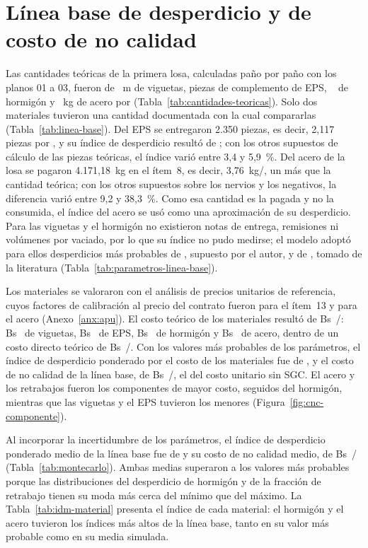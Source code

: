 \section{Línea base de desperdicio y de costo de no calidad}
\label{sec:res-linea-base}

Las cantidades teóricas de la primera losa, calculadas paño por paño con los planos 01 a 03, fueron de \QteoVig{}~m de viguetas, \QteoEps{} piezas de complemento de EPS, \QteoHor{}~\mtres{} de hormigón y \QteoAce{}~kg de acero por \mdos{} (Tabla~\ref{tab:cantidades-teoricas}). Solo dos materiales tuvieron una cantidad documentada con la cual compararlas (Tabla~\ref{tab:linea-base}). Del EPS se entregaron 2.350 piezas, es decir, 2,117 piezas por \mdos{}, y su índice de desperdicio resultó de \IDMsinEps{}; con los otros supuestos de cálculo de las piezas teóricas, el índice varió entre 3,4 y 5,9~\%. Del acero de la losa se pagaron 4.171,18~kg en el ítem~8, es decir, 3,76~kg/\mdos{}, un \IDMsinAce{} más que la cantidad teórica; con los otros supuestos sobre los nervios y los negativos, la diferencia varió entre 9,2 y 38,3~\%. Como esa cantidad es la pagada y no la consumida, el índice del acero se usó como una aproximación de su desperdicio. Para las viguetas y el hormigón no existieron notas de entrega, remisiones ni volúmenes por vaciado, por lo que su índice no pudo medirse; el modelo adoptó para ellos desperdicios más probables de \IDMsinVig{}, supuesto por el autor, y de \IDMsinHor{}, tomado de la literatura (Tabla~\ref{tab:parametros-linea-base}).

Los materiales se valoraron con el análisis de precios unitarios de referencia, cuyos factores de calibración al precio del contrato fueron \KappaTrece{} para el ítem~13 y \KappaAcero{} para el acero (Anexo~\ref{anx:apu}). El costo teórico de los materiales resultó de Bs~\CMteo/\mdos{}: Bs~\CostoVig{} de viguetas, Bs~\CostoEps{} de EPS, Bs~\CostoHor{} de hormigón y Bs~\CostoAce{} de acero, dentro de un costo directo teórico de Bs~\CDteo/\mdos{}. Con los valores más probables de los parámetros, el índice de desperdicio ponderado por el costo de los materiales fue de \IDMsinDet{}, y el costo de no calidad de la línea base, de Bs~\CNCsinDet/\mdos{}, el \CNCsinDetPct{} del costo unitario sin SGC. El acero y los retrabajos fueron los componentes de mayor costo, seguidos del hormigón, mientras que las viguetas y el EPS tuvieron los menores (Figura~\ref{fig:cnc-componente}).

Al incorporar la incertidumbre de los parámetros, el índice de desperdicio ponderado medio de la línea base fue de \IDMsinMedia{} y su costo de no calidad medio, de Bs~\CNCsinMedia/\mdos{} (Tabla~\ref{tab:montecarlo}). Ambas medias superaron a los valores más probables porque las distribuciones del desperdicio de hormigón y de la fracción de retrabajo tienen su moda más cerca del mínimo que del máximo. La Tabla~\ref{tab:idm-material} presenta el índice de cada material: el hormigón y el acero tuvieron los índices más altos de la línea base, tanto en su valor más probable como en su media simulada.

